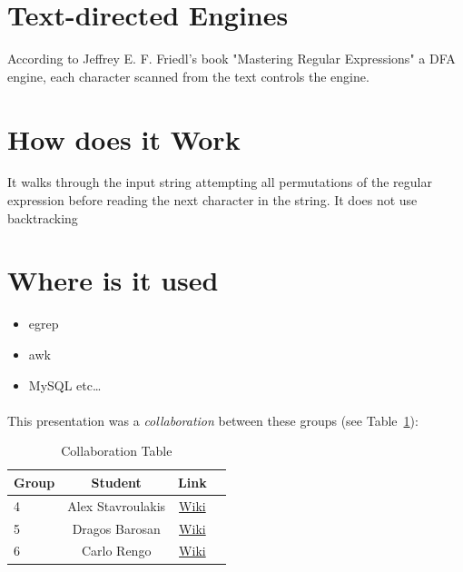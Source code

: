 \documentclass[a4paper,11pt]{report}
\begin{document}
\section{Text-directed Engines}
\begin{center}
According to Jeffrey E. F. Friedl’s book "Mastering Regular Expressions" a DFA engine, each character scanned from the text controls the engine. \cite{book}
\end{center}

\section{How does it Work}
\begin{flushright}
It walks through the input string attempting all permutations of the regular expression before reading the next character in the string. It does not use backtracking
\end{flushright}

\section{Where is it used}
\begin{itemize}
  \item egrep
  \item awk
  \item MySQL etc\ldots
\end{itemize}

\paragraph{}
This presentation was a \emph{collaboration} between these groups (see Table~\ref{tab:coltab2}): \\

\begin{table}[h]
\centering
 \begin{tabular}{| l | c | c | c |}
 \hline \textbf{Group} & \textbf{Student} & \textbf{Link} \\
 \hline 
 4 & Alex Stavroulakis & \href{https://www.os3.nl/2014-2015/students/alexandros_stavroulakis/es}{Wiki}\\
 \hline 
 5 & Dragos Barosan & \href{https://www.os3.nl/2014-2015/students/dragos_barosan/es/week2#homework_3}{Wiki} \\ 
 \hline 
 6 & Carlo Rengo & \href{https://www.os3.nl/2014-2015/students/carlo_rengo/es/homewrk_3}{Wiki} \\ 
 \hline 
 \end{tabular} 
 \caption[Collaboration Table]{Collaboration Table}
 \label{tab:coltab2}
\end{table}
\end{document}
